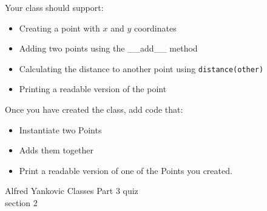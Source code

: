 \documentclass{article}
\begin{document}
\begin{enumerate}
		Your class should support:
		\begin{itemize}
			\item Creating a point with $x$ and $y$ coordinates
			\item Adding two points using the \_\_add\_\_ method
			\item Calculating the distance to another point using \texttt{distance(other)}
			\item Printing a readable version of the point
		\end{itemize}
		
		Once you have created the class, add code that:
		\begin{itemize}
			\item Instantiate two Points
			\item Adds them together
			\item Print a readable version of one of the Points you created.
		\end{itemize}



\end{enumerate}
\pagebreak
Alfred Yankovic \hfill Classes Part 3 quiz\\
section 2\\
\end{document}
